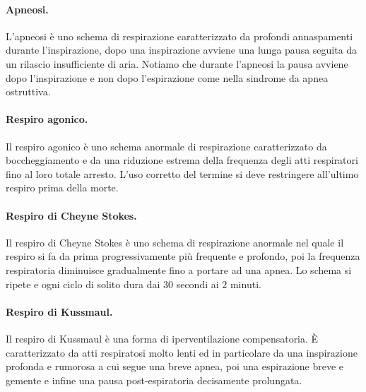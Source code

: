 \paragraph{Apneosi.}
L'apneosi \`e uno schema di respirazione caratterizzato da profondi annaspamenti durante l'inspirazione, dopo una inspirazione avviene una lunga pausa seguita da un rilascio insufficiente di aria.
Notiamo che durante l'apneosi la pausa avviene dopo l'inspirazione e non dopo l'espirazione come nella sindrome da apnea ostruttiva.

\paragraph{Respiro agonico.}
Il respiro agonico \`e uno schema anormale di respirazione caratterizzato da boccheggiamento e da una riduzione estrema della frequenza degli atti respiratori fino al loro totale arresto. 
L'uso corretto del termine si deve restringere all'ultimo respiro prima della morte. 

\paragraph{Respiro di Cheyne Stokes.}
Il respiro di Cheyne Stokes \`e uno schema di respirazione anormale nel quale il respiro si fa da prima progressivamente pi\`u frequente e profondo, poi la frequenza respiratoria diminuisce gradualmente fino a portare ad una apnea. 
Lo schema si ripete e ogni ciclo di solito dura dai $30$ secondi ai $2$ minuti. 

\paragraph{Respiro di Kussmaul.}
Il respiro di Kussmaul \`e una forma di iperventilazione compensatoria. 
\`E caratterizzato da atti respiratosi molto lenti ed in particolare da una inspirazione profonda e rumorosa a cui segue una breve apnea, poi una espirazione breve e gemente e infine una pausa post-espiratoria decisamente prolungata.


